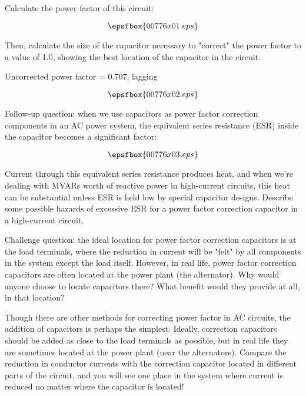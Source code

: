 

Calculate the power factor of this circuit:

$$\epsfbox{00776x01.eps}$$

Then, calculate the size of the capacitor necessary to "correct" the power factor to a value of 1.0, showing the best location of the capacitor in the circuit.







Uncorrected power factor = 0.707, lagging

$$\epsfbox{00776x02.eps}$$

\vskip 10pt

Follow-up question: when we use capacitors as power factor correction components in an AC power system, the equivalent series resistance (ESR) inside the capacitor becomes a significant factor:

$$\epsfbox{00776x03.eps}$$

Current through this equivalent series resistance produces heat, and when we're dealing with MVARs worth of reactive power in high-current circuits, this heat can be substantial unless ESR is held low by special capacitor designs.  Describe some possible hazards of excessive ESR for a power factor correction capacitor in a high-current circuit.

\vskip 10pt

Challenge question: the ideal location for power factor correction capacitors is at the load terminals, where the reduction in current will be "felt" by all components in the system except the load itself.  However, in real life, power factor correction capacitors are often located at the power plant (the alternator).  Why would anyone choose to locate capacitors there?  What benefit would they provide at all, in that location?







Though there are other methods for correcting power factor in AC circuits, the addition of capacitors is perhaps the simplest.  Ideally, correction capacitors should be added as close to the load terminals as possible, but in real life they are sometimes located at the power plant (near the alternators).  Compare the reduction in conductor currents with the correction capacitor located in different parts of the circuit, and you will see one place in the system where current is reduced no matter where the capacitor is located!

